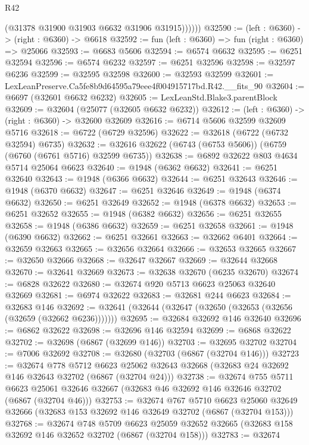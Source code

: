 \begin{lexlean}{R42}
\begin{coremodule}
{              (@31378 @31900 @31903 @6632 @31906 @31915))))))
@32590 := (left : @6360) -> (right : @6360) -> @6618
@32592 := fun (left : @6360) => fun (right : @6360) => @25066
@32593 := @6683 @5606
@32594 := @6574 @6632
@32595 := @6251 @32594
@32596 := @6574 @6232
@32597 := @6251 @32596
@32598 := @32597 @6236
@32599 := @32595 @32598
@32600 := @32593 @32599
@32601 := LexLeanPreserve.Ca5fe8b9d64595a79eee4f004915717bd.R42.__fits_90
@32604 := @6697 (@32601 @6632 @6232)
@32605 := LexLeanStd.Blake3.parentBlock
@32609 := @32604 (@25077 (@32605 @6632 @6232))
@32612 := (left : @6360) -> (right : @6360) -> @32600 @32609
@32616 := @6714 @5606 @32599 @32609 @5716
@32618 := @6722 (@6729 @32596)
@32622 := @32618 (@6722 (@6732 @32594) @6735)
@32632 := @32616 @32622 (@6743 (@6753 @5606)) (@6759 (@6760 (@6761 @5716) @32599 @6735))
@32638 := @6892 @32622 @803 @4634 @5714 @25064 @6623
@32640 := @1948 (@6362 @6632)
@32641 := @6251 @32640
@32643 := @1948 (@6366 @6632)
@32644 := @6251 @32643
@32646 := @1948 (@6370 @6632)
@32647 := @6251 @32646
@32649 := @1948 (@6374 @6632)
@32650 := @6251 @32649
@32652 := @1948 (@6378 @6632)
@32653 := @6251 @32652
@32655 := @1948 (@6382 @6632)
@32656 := @6251 @32655
@32658 := @1948 (@6386 @6632)
@32659 := @6251 @32658
@32661 := @1948 (@6390 @6632)
@32662 := @6251 @32661
@32663 := @32662 @6401
@32664 := @32659 @32663
@32665 := @32656 @32664
@32666 := @32653 @32665
@32667 := @32650 @32666
@32668 := @32647 @32667
@32669 := @32644 @32668
@32670 := @32641 @32669
@32673 := @32638 @32670 (@6235 @32670)
@32674 := @6828 @32622
@32680 := @32674 @920 @5713 @6623 @25063 @32640 @32669
@32681 := @6974 @32622
@32683 := @32681 @244 @6623
@32684 := @32683 @146
@32692 := @32641 (@32644 (@32647 (@32650 (@32653 (@32656 (@32659 (@32662 @6236)))))))
@32695 := @32684 @32692 @146 @32640
@32696 := @6862 @32622
@32698 := @32696 @146 @32594
@32699 := @6868 @32622
@32702 := @32698 (@6867 (@32699 @146))
@32703 := @32695 @32702
@32704 := @7006 @32692
@32708 := @32680 (@32703 (@6867 (@32704 @146)))
@32723 := @32674
    @778
    @5712
    @6623
    @25062
    @32643
    @32668
    (@32683 @24 @32692 @146 @32643 @32702 (@6867 (@32704 @24)))
@32738 := @32674
    @755
    @5711
    @6623
    @25061
    @32646
    @32667
    (@32683 @46 @32692 @146 @32646 @32702 (@6867 (@32704 @46)))
@32753 := @32674
    @767
    @5710
    @6623
    @25060
    @32649
    @32666
    (@32683 @153 @32692 @146 @32649 @32702 (@6867 (@32704 @153)))
@32768 := @32674
    @748
    @5709
    @6623
    @25059
    @32652
    @32665
    (@32683 @158 @32692 @146 @32652 @32702 (@6867 (@32704 @158)))
@32783 := @32674
}
\end{coremodule}
\end{lexlean}
